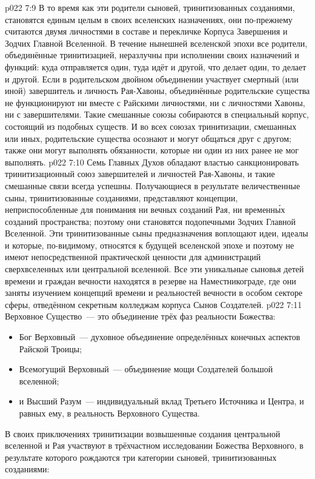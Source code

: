 \vs p022 7:9 В то время как эти родители сыновей, тринитизованных созданиями, становятся единым целым в своих вселенских назначениях, они по\hyp{}прежнему считаются двумя личностями в составе и перекличке Корпуса Завершения и Зодчих Главной Вселенной. В течение нынешней вселенской эпохи все родители, объединённые тринитизацией, неразлучны при исполнении своих назначений и функций: куда отправляется один, туда идёт и другой, что делает один, то делает и другой. Если в родительском двойном объединении участвует смертный (или иной) завершитель и личность Рая\hyp{}Хавоны, объединённые родительские существа не функционируют ни вместе с Райскими личностями, ни с личностями Хавоны, ни с завершителями. Такие смешанные союзы собираются в специальный корпус, состоящий из подобных существ. И во всех союзах тринитизации, смешанных или иных, родительские существа осознают и могут общаться друг с другом; также они могут выполнять обязанности, которые ни один из них ранее не мог выполнять.
\vs p022 7:10 \pc Семь Главных Духов обладают властью санкционировать тринитизационный союз завершителей и личностей Рая\hyp{}Хавоны, и такие смешанные связи всегда успешны. Получающиеся в результате величественные сыны, тринитизованные созданиями, представляют концепции, неприспособленные для понимания ни вечных созданий Рая, ни временн\'ых созданий пространства; поэтому они становятся подопечными Зодчих Главной Вселенной. Эти тринитизованные сыны предназначения воплощают идеи, идеалы и  которые, по\hyp{}видимому, относятся к будущей вселенской эпохе и поэтому не имеют непосредственной практической ценности для администраций сверхвселенных или центральной вселенной. Все эти уникальные сыновья детей времени и граждан вечности находятся в резерве на Наместникограде, где они заняты изучением концепций времени и реальностей вечности в особом секторе сферы, отведённом секретным колледжам корпуса Сынов Создателей.
\vs p022 7:11 \pc Верховное Существо~--- это объединение трёх фаз реальности Божества:\begin{itemize}\item Бог Верховный~--- духовное объединение определённых конечных аспектов Райской Троицы; \item Всемогущий Верховный~--- объединение мощи Создателей большой вселенной; \item и Высший Разум~--- индивидуальный вклад Третьего Источника и Центра, и равных ему, в реальность Верховного Существа.\end{itemize} В своих приключениях тринитизации возвышенные создания центральной вселенной и Рая участвуют в трёхчастном исследовании Божества Верховного, в результате которого рождаются три категории сыновей, тринитизованных созданиями:
